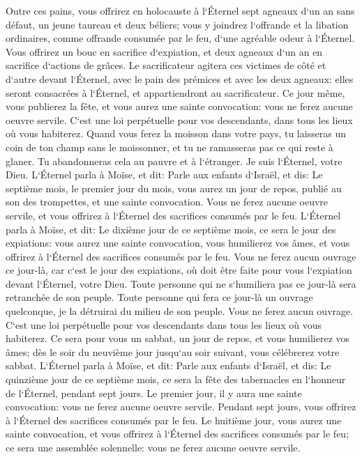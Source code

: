 \verse Outre ces pains, vous offrirez en holocauste à l`Éternel sept agneaux d`un an sans défaut, un jeune taureau et deux béliers; vous y joindrez l`offrande et la libation ordinaires, comme offrande consumée par le feu, d`une agréable odeur à l`Éternel. 
\verse Vous offrirez un bouc en sacrifice d`expiation, et deux agneaux d`un an en sacrifice d`actions de grâces. 
\verse Le sacrificateur agitera ces victimes de côté et d`autre devant l`Éternel, avec le pain des prémices et avec les deux agneaux: elles seront consacrées à l`Éternel, et appartiendront au sacrificateur. 
\verse Ce jour même, vous publierez la fête, et vous aurez une sainte convocation: vous ne ferez aucune oeuvre servile. C`est une loi perpétuelle pour vos descendants, dans tous les lieux où vous habiterez. 
\verse Quand vous ferez la moisson dans votre pays, tu laisseras un coin de ton champ sans le moissonner, et tu ne ramasseras pas ce qui reste à glaner. Tu abandonneras cela au pauvre et à l`étranger. Je suis l`Éternel, votre Dieu. 
\verse L`Éternel parla à Moïse, et dit: 
\verse Parle aux enfants d`Israël, et dis: Le septième mois, le premier jour du mois, vous aurez un jour de repos, publié au son des trompettes, et une sainte convocation. 
\verse Vous ne ferez aucune oeuvre servile, et vous offrirez à l`Éternel des sacrifices consumés par le feu. 
\verse L`Éternel parla à Moïse, et dit: 
\verse Le dixième jour de ce septième mois, ce sera le jour des expiations: vous aurez une sainte convocation, vous humilierez vos âmes, et vous offrirez à l`Éternel des sacrifices consumés par le feu. 
\verse Vous ne ferez aucun ouvrage ce jour-là, car c`est le jour des expiations, où doit être faite pour vous l`expiation devant l`Éternel, votre Dieu. 
\verse Toute personne qui ne s`humiliera pas ce jour-là sera retranchée de son peuple. 
\verse Toute personne qui fera ce jour-là un ouvrage quelconque, je la détruirai du milieu de son peuple. 
\verse Vous ne ferez aucun ouvrage. C`est une loi perpétuelle pour vos descendants dans tous les lieux où vous habiterez. 
\verse Ce sera pour vous un sabbat, un jour de repos, et vous humilierez vos âmes; dès le soir du neuvième jour jusqu`au soir suivant, vous célébrerez votre sabbat. 
\verse L`Éternel parla à Moïse, et dit: 
\verse Parle aux enfants d`Israël, et dis: Le quinzième jour de ce septième mois, ce sera la fête des tabernacles en l`honneur de l`Éternel, pendant sept jours. 
\verse Le premier jour, il y aura une sainte convocation: vous ne ferez aucune oeuvre servile. 
\verse Pendant sept jours, vous offrirez à l`Éternel des sacrifices consumés par le feu. Le huitième jour, vous aurez une sainte convocation, et vous offrirez à l`Éternel des sacrifices consumés par le feu; ce sera une assemblée solennelle: vous ne ferez aucune oeuvre servile. 
